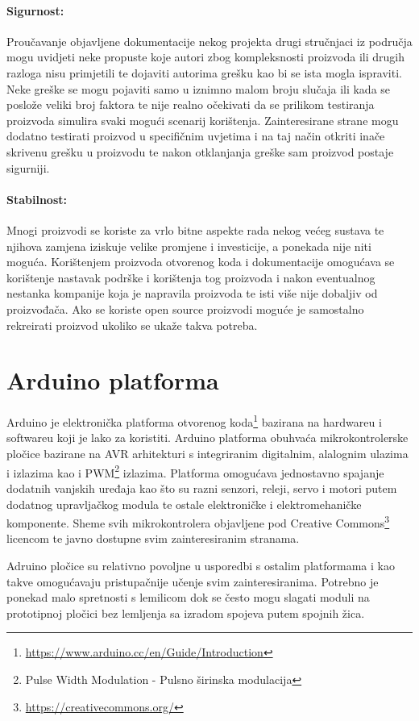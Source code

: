 \paragraph{Sigurnost:}
Proučavanje objavljene dokumentacije nekog projekta drugi stručnjaci iz područja mogu uvidjeti neke propuste koje autori zbog kompleksnosti proizvoda ili drugih razloga nisu primjetili te dojaviti autorima grešku kao bi se ista mogla ispraviti. 
Neke greške se mogu pojaviti samo u iznimno malom broju slučaja ili kada se poslože veliki broj faktora te nije realno očekivati da se prilikom testiranja proizvoda simulira svaki mogući scenarij korištenja.
Zainteresirane strane mogu dodatno testirati proizvod u specifičnim uvjetima i na taj način otkriti inače skrivenu grešku u proizvodu te nakon otklanjanja greške sam proizvod postaje sigurniji.

\paragraph{Stabilnost:}
Mnogi proizvodi se koriste za vrlo bitne aspekte rada nekog većeg sustava te njihova zamjena iziskuje velike promjene i investicije, a ponekada nije niti moguća.
Korištenjem proizvoda otvorenog koda i dokumentacije omogućava se korištenje nastavak podrške i korištenja tog proizvoda i nakon eventualnog nestanka kompanije koja je napravila proizvoda te isti više nije dobaljiv od proizvođača. 
Ako se koriste open source proizvodi moguće je samostalno rekreirati proizvod ukoliko se ukaže takva potreba.


\section{Arduino platforma}
Arduino je elektronička platforma otvorenog koda\footnote{\url{https://www.arduino.cc/en/Guide/Introduction}} bazirana na hardwareu i softwareu koji je lako za koristiti.
Arduino platforma obuhvaća mikrokontrolerske pločice bazirane na AVR arhitekturi s integriranim digitalnim, alalognim ulazima i izlazima kao i PWM\footnote{Pulse Width Modulation - Pulsno širinska modulacija} izlazima.
Platforma omogućava jednostavno spajanje dodatnih vanjskih uređaja kao što su razni senzori, releji, servo i motori putem dodatnog upravljačkog modula te ostale elektroničke i elektromehaničke komponente.
Sheme svih mikrokontrolera objavljene pod Creative Commons\footnote{\url{https://creativecommons.org/}} licencom te javno dostupne svim zainteresiranim stranama.

Adruino pločice su relativno povoljne u usporedbi s ostalim platformama i kao takve omogućavaju pristupačnije učenje svim zainteresiranima.
Potrebno je ponekad malo spretnosti s lemilicom dok se često mogu slagati moduli na prototipnoj pločici bez lemljenja sa izradom spojeva putem spojnih žica.

